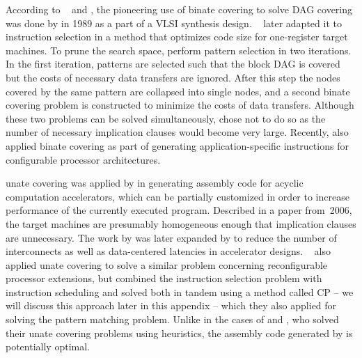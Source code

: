 According to \citeauthor{LiaoEtAl:1995}~\cite{LiaoEtAl:1995, LiaoEtAl:1998} and
\textcite{CongEtAl:2004}, the pioneering use of \gls{binate covering} to solve
\gls{DAG covering} was done by \textcite{Rudell:1989} in 1989 as a part of a
\gls{VLSI} synthesis design.
%
\citeauthor{LiaoEtAl:1995}~\cite{LiaoEtAl:1995, LiaoEtAl:1998} later adapted it to
\gls{instruction selection} in a method that optimizes code size for
one-\gls{register} \glspl{target machine}.
%
To prune the search space, \citeauthor{LiaoEtAl:1995} perform \gls{pattern selection}
in two iterations.
%
In the first iteration, \glspl{pattern} are selected such that the \gls{block
  DAG} is covered but the costs of necessary data transfers are ignored.
%
After this step the \glspl{node} covered by the same \gls{pattern} are collapsed
into single \glspl{node}, and a second \gls{binate covering} problem is
constructed to minimize the costs of data transfers.
%
Although these two problems can be solved simultaneously, \citeauthor{LiaoEtAl:1995}
chose not to do so as the number of necessary \glspl{implication clause} would
become very large.
%
Recently, \textcite{CongEtAl:2004} also applied \gls{binate covering} as part of
generating application-specific \glspl{instruction} for configurable processor
architectures.

\Gls{unate covering} was applied by \textcite{ClarkEtAl:2006} in generating
\gls{assembly code} for acyclic computation accelerators, which can be partially
customized in order to increase performance of the currently executed
\gls{program}.
%
Described in a paper from~2006, the \glspl{target machine} are presumably
homogeneous enough that \glspl{implication clause} are unnecessary.
%
The work by \citeauthor{ClarkEtAl:2006} was later expanded by \textcite{HormatiEtAl:2007}
to reduce the number of interconnects as well as data-centered latencies in
accelerator designs.
%
\citeauthor{MartinEtAl:2009}~\cite{MartinEtAl:2009, MartinEtAl:2012} also applied \gls{unate
  covering} to solve a similar problem concerning reconfigurable processor
extensions, but combined the \gls{instruction selection} problem with
\gls{instruction scheduling} and solved both in tandem using a method called
\glsdesc{CP} -- we will discuss this approach later in this appendix -- which
they also applied for solving the \gls{pattern matching} problem.
%
Unlike in the cases of \citeauthor{ClarkEtAl:2006} and \citeauthor{HormatiEtAl:2007}, who
solved their \gls{unate covering} problems using heuristics, the \gls{assembly
  code} generated by \citeauthor{MartinEtAl:2009} is potentially optimal.


